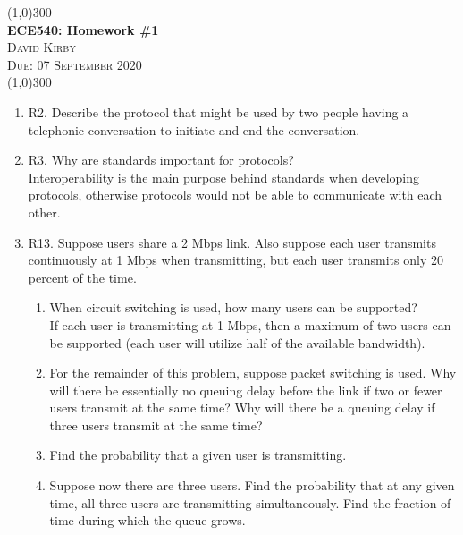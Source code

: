 \documentclass[12pt]{article}
\begin{document}
 	\begin{center}
    \line(1,0){300}\\[0.25cm]
 	\Large{\bfseries ECE540: Homework \#1}\\
 	\textsc{\large David Kirby}\\
 	\textsc{\large Due: 07 September 2020}\\
 	\line(1,0){300}\\[0.75cm]
 	\end{center}

\begin{enumerate}
\item R2.  Describe the protocol that might be used by two people having a telephonic conversation to initiate and end the conversation.\\[1em]


\item R3.  Why are standards important for protocols?\\[1em]
Interoperability is the main purpose behind standards when developing protocols, otherwise protocols would not be able to communicate with each other.

\item R13.  Suppose users share a 2 Mbps link. Also suppose each user transmits continuously at 1 Mbps when transmitting, but each user transmits only 20 percent of the time.
    \begin{enumerate}
        \item When circuit switching is used, how many users can be supported?\\[1em]
        If each user is transmitting at 1 Mbps, then a maximum of two users can be supported (each user will utilize half of the available bandwidth).

        \item For the remainder of this problem, suppose packet switching is used. Why will there be essentially no queuing delay before the link if two or fewer users transmit at the same time? Why will there be a queuing delay if three users transmit at the same time?\\[1em]

        \item Find the probability that a given user is transmitting.\\[1em]

        \item Suppose now there are three users. Find the probability that at any given time, all three users are transmitting simultaneously. Find the fraction of time during which the queue grows.
    \end{enumerate}


\end{enumerate}
\end{document}
